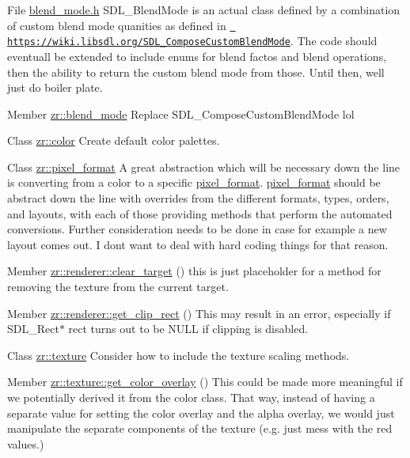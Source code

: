 
\begin{DoxyRefList}
\item[File \mbox{\hyperlink{blend__mode_8h}{blend\+\_\+mode.h}} ]\label{todo__todo000001}%
%
S\+D\+L\+\_\+\+Blend\+Mode is an actual class defined by a combination of custom blend mode quanities as defined in \href{https://wiki.libsdl.org/SDL_ComposeCustomBlendMode}{\texttt{ https\+://wiki.\+libsdl.\+org/\+S\+D\+L\+\_\+\+Compose\+Custom\+Blend\+Mode}}. The code should eventuall be extended to include enums for blend factos and blend operations, then the ability to return the custom blend mode from those. Until then, we\textquotesingle{}ll just do boiler plate.  
\item[Member \mbox{\hyperlink{blend__mode_8h_a5f8dcdda70c99298ce87c3c463cdf629}{zr::blend\+\_\+mode}} ]\label{todo__todo000002}%
%
Replace S\+D\+L\+\_\+\+Compose\+Custom\+Blend\+Mode lol  
\item[Class \mbox{\hyperlink{structzr_1_1color}{zr::color}} ]\label{todo__todo000003}%
%
Create default color palettes.  
\item[Class \mbox{\hyperlink{classzr_1_1pixel__format}{zr::pixel\+\_\+format}} ]\label{todo__todo000004}%
%
A great abstraction which will be necessary down the line is converting from a color to a specific \mbox{\hyperlink{classzr_1_1pixel__format}{pixel\+\_\+format}}. \mbox{\hyperlink{classzr_1_1pixel__format}{pixel\+\_\+format}} should be abstract down the line with overrides from the different formats, types, orders, and layouts, with each of those providing methods that perform the automated conversions. Further consideration needs to be done in case for example a new layout comes out. I don\textquotesingle{}t want to deal with hard coding things for that reason. 
\item[Member \mbox{\hyperlink{classzr_1_1renderer_a2491df48330b3c0d15d1e440817ddbeb}{zr::renderer::clear\+\_\+target}} ()]\label{todo__todo000006}%
%
this is just placeholder for a method for removing the texture from the current target. 
\item[Member \mbox{\hyperlink{classzr_1_1renderer_a1a93b15028f2bc27b2051bc912a70b4b}{zr::renderer::get\+\_\+clip\+\_\+rect}} ()]\label{todo__todo000005}%
%
This may result in an error, especially if S\+D\+L\+\_\+\+Rect$\ast$ rect turns out to be N\+U\+LL if clipping is disabled.  
\item[Class \mbox{\hyperlink{classzr_1_1texture}{zr::texture}} ]\label{todo__todo000007}%
%
Consider how to include the texture scaling methods. 
\item[Member \mbox{\hyperlink{classzr_1_1texture_a6b1635827466882d2321a3e069fed0b4}{zr::texture::get\+\_\+color\+\_\+overlay}} ()]\label{todo__todo000009}%
%
This could be made more meaningful if we potentially derived it from the color class. That way, instead of having a separate value for setting the color overlay and the alpha overlay, we would just manipulate the separate components of the texture (e.\+g. just mess with the red values.)


\end{DoxyRefList}

